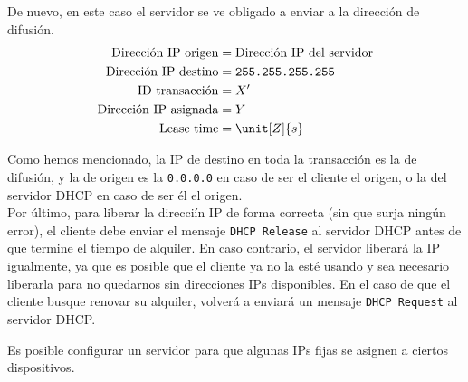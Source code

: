 \begin{itemize}
    De nuevo, en este caso el servidor se ve obligado a enviar a la dirección de difusión.
    \begin{align*}
        \text{Dirección IP origen} &= \text{Dirección IP del servidor} \\
        \text{Dirección IP destino} &= \texttt{255.255.255.255} \\
        \text{ID transacción} &= X' \\
        \text{Dirección IP asignada} &= Y \\
        \text{Lease time} &= \unit[Z]{s}
    \end{align*}
\end{itemize}

Como hemos mencionado, la IP de destino en toda la transacción es la de difusión, y la de origen es la \verb|0.0.0.0| en caso de ser el cliente el origen, o la del servidor \acrshort{DHCP} en caso de ser él el origen.\\

Por último, para liberar la direcciín IP de forma correcta (sin que surja ningún error), el cliente debe enviar el mensaje \verb|DHCP Release| al servidor \acrshort{DHCP} antes de que termine el tiempo de alquiler. En caso contrario, el servidor liberará la IP igualmente, ya que es posible que el cliente ya no la esté usando y sea necesario liberarla para no quedarnos sin direcciones IPs disponibles. En el caso de que el cliente busque renovar su alquiler, volverá a enviará un mensaje \verb|DHCP Request| al servidor \acrshort{DHCP}.

\begin{observacion}
    Es posible configurar un servidor para que algunas IPs fijas se asignen a ciertos dispositivos.
\end{observacion}